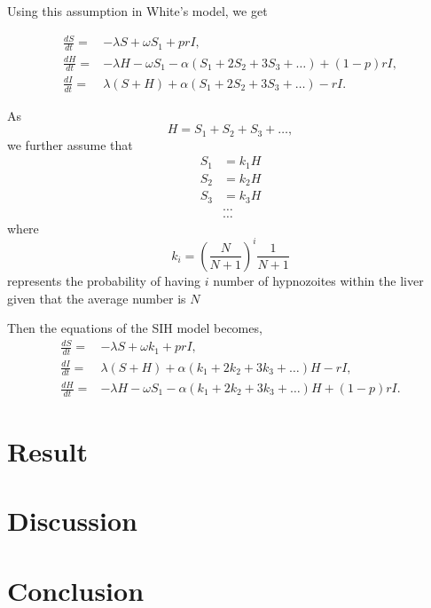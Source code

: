 \documentclass[12pt]{article}
\begin{document}
Using this assumption in White's model, we get

\begin{align}
    \label{eqn:2.6}
    \frac {dS}{dt}=&-\lambda S+\omega S_1+prI,\\
    \label{eqn:2.7}
    \frac {dH}{dt}=&-\lambda H-\omega S_1-\alpha(S_1+2S_2+3S_3+\ldots)+(1-p)rI,\\
    \label{eqn:2.8}
    \frac {dI}{dt}=&\lambda(S+H)+\alpha(S_1+2S_2+3S_3+\ldots)-rI.
\end{align}

As $$H=S_1+S_2+S_3+\ldots , $$
we further assume that 
\begin{align*}
    S_1&=k_1H\\
    S_2&=k_2H\\
    S_3&=k_3H\\
    &\ldots\\
    &\ldots
\end{align*}
where $$k_i=\left(\frac{N}{N+1}\right)^{i}\frac{1}{N+1}$$ represents the probability of having $i$ number of hypnozoites within the liver given that the average number is $N$

Then the equations of the SIH model becomes,
\begin{align}
    \label{eqn:2.9}
    \frac {dS}{dt}=&-\lambda S+\omega k_1+prI,\\
    \label{eqn:2.10}
    \frac {dI}{dt}=&\lambda(S+H)+\alpha(k_1+2k_2+3k_3+\ldots)H-rI,\\
    \label{eqn:2.11}
    \frac {dH}{dt}=&-\lambda H-\omega S_1-\alpha(k_1+2k_2+3k_3+\ldots)H+(1-p)rI.
\end{align}



\section{Result}
\section{Discussion}


\section{Conclusion}


 
\end{document}
